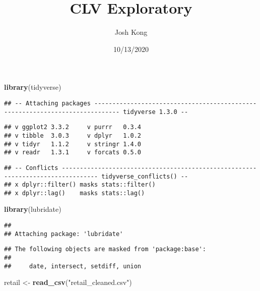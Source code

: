 \documentclass[]{article}
\title{CLV Exploratory}
\author{Josh Kong}
\date{10/13/2020}
\newenvironment{Shaded}{\begin{snugshade}}{\end{snugshade}}
\newcommand{\KeywordTok}[1]{\textcolor[rgb]{0.13,0.29,0.53}{\textbf{#1}}}
\newcommand{\NormalTok}[1]{#1}
\newcommand{\StringTok}[1]{\textcolor[rgb]{0.31,0.60,0.02}{#1}}
\begin{document}
\maketitle

\begin{Shaded}
\begin{Highlighting}[]
\KeywordTok{library}\NormalTok{(tidyverse)}
\end{Highlighting}
\end{Shaded}

\begin{verbatim}
## -- Attaching packages ----------------------------------------------------------------------------- tidyverse 1.3.0 --
\end{verbatim}

\begin{verbatim}
## v ggplot2 3.3.2     v purrr   0.3.4
## v tibble  3.0.3     v dplyr   1.0.2
## v tidyr   1.1.2     v stringr 1.4.0
## v readr   1.3.1     v forcats 0.5.0
\end{verbatim}

\begin{verbatim}
## -- Conflicts -------------------------------------------------------------------------------- tidyverse_conflicts() --
## x dplyr::filter() masks stats::filter()
## x dplyr::lag()    masks stats::lag()
\end{verbatim}

\begin{Shaded}
\begin{Highlighting}[]
\KeywordTok{library}\NormalTok{(lubridate)}
\end{Highlighting}
\end{Shaded}

\begin{verbatim}
## 
## Attaching package: 'lubridate'
\end{verbatim}

\begin{verbatim}
## The following objects are masked from 'package:base':
## 
##     date, intersect, setdiff, union
\end{verbatim}

\begin{Shaded}
\begin{Highlighting}[]
\NormalTok{retail <-}\StringTok{ }\KeywordTok{read_csv}\NormalTok{(}\StringTok{"retail_cleaned.csv"}\NormalTok{)}
\end{Highlighting}
\end{Shaded}
\end{document}
